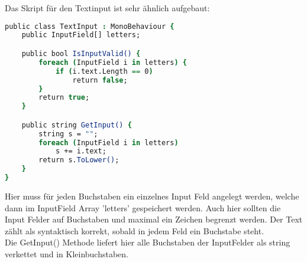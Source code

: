 {Das Skript für den Textinput ist sehr ähnlich aufgebaut:
\begin{lstlisting}[language=csh, caption={Skript für einen zweistelligen Zahlen Input}]
public class TextInput : MonoBehaviour {
    public InputField[] letters;

    public bool IsInputValid() {
        foreach (InputField i in letters) {
            if (i.text.Length == 0)
                return false;
        }
        return true;
    }

    public string GetInput() {
        string s = "";
        foreach (InputField i in letters)
            s += i.text;
        return s.ToLower();
    }
}
\end{lstlisting}
Hier muss für jeden Buchstaben ein einzelnes Input Feld angelegt werden, welche dann im InputField Array 'letters' gespeichert werden. Auch hier sollten die Input Felder auf Buchstaben und maximal ein Zeichen begrenzt werden. Der Text zählt als syntaktisch korrekt, sobald in jedem Feld ein Buchstabe steht.\\
Die GetInput() Methode liefert hier alle Buchstaben der InputFelder als string verkettet und in Kleinbuchstaben.

}
